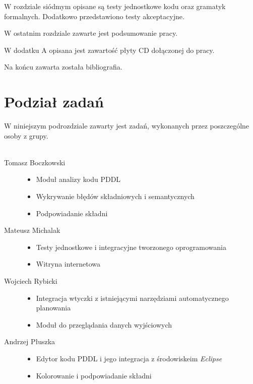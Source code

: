W rozdziale siódmym opisane są testy jednostkowe kodu oraz gramatyk formalnych. Dodatkowo przedstawiono testy akceptacyjne.

W ostatnim rozdziale zawarte jest podsumowanie pracy.

W dodatku A opisana jest zawartość płyty CD dołączonej do pracy.

Na końcu zawarta została bibliografia.
\section{Podział zadań}
W niniejszym podrozdziale zawarty jest zadań, wykonanych przez poszczególne osoby z grupy.\\\\
\begin{description}
  \item[Tomasz Boczkowski] \hfill 
  \begin{itemize}
\item Moduł analizy kodu PDDL
\item Wykrywanie błędów składniowych i semantycznych
\item Podpowiadanie składni
\end{itemize}
  \item[Mateusz Michalak] \hfill 
    \begin{itemize}
\item Testy jednostkowe i integracyjne tworzonego oprogramowania
\item Witryna internetowa
\end{itemize}
  \item[Wojciech Rybicki] \hfill 
    \begin{itemize}
\item Integracja wtyczki z istniejącymi narzędziami automatycznego planowania
\item Moduł do przeglądania danych wyjściowych
\end{itemize}
  \item[Andrzej Płuszka] \hfill 
    \begin{itemize}
\item Edytor kodu PDDL i jego integracja z środowiskeim \textit{Eclipse}
\item Kolorowanie i podpowiadanie składni
\end{itemize}
\end{description}




